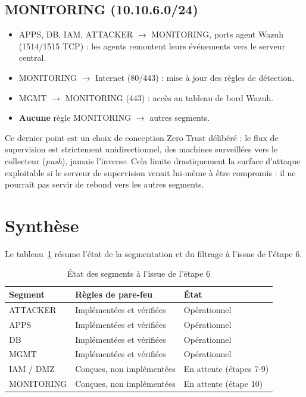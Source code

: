 \subsection{MONITORING (10.10.6.0/24)}

\begin{itemize}
    \item APPS, DB, IAM, ATTACKER $\rightarrow$ MONITORING, ports agent
    Wazuh (1514/1515 TCP) : les agents remontent leurs événements vers le
    serveur central.
    \item MONITORING $\rightarrow$ Internet (80/443) : mise à jour des
    règles de détection.
    \item MGMT $\rightarrow$ MONITORING (443) : accès au tableau de bord
    Wazuh.
    \item \textbf{Aucune} règle MONITORING $\rightarrow$ autres segments.
\end{itemize}

Ce dernier point est un choix de conception Zero Trust délibéré : le flux
de supervision est strictement unidirectionnel, des machines surveillées
vers le collecteur (\emph{push}), jamais l'inverse. Cela limite
drastiquement la surface d'attaque exploitable si le serveur de
supervision venait lui-même à être compromis : il ne pourrait pas servir
de rebond vers les autres segments.

\section{Synthèse}

Le tableau~\ref{tab:synthese-step6} résume l'état de la segmentation et
du filtrage à l'issue de l'étape 6.

\begin{table}[h]
\centering
\caption{État des segments à l'issue de l'étape 6}
\label{tab:synthese-step6}
\begin{tabular}{|l|l|l|}
\hline
\textbf{Segment} & \textbf{Règles de pare-feu} & \textbf{État} \\
\hline
ATTACKER & Implémentées et vérifiées & Opérationnel \\
APPS & Implémentées et vérifiées & Opérationnel \\
DB & Implémentées et vérifiées & Opérationnel \\
MGMT & Implémentées et vérifiées & Opérationnel \\
IAM / DMZ & Conçues, non implémentées & En attente (étapes 7-9) \\
MONITORING & Conçues, non implémentées & En attente (étape 10) \\
\hline
\end{tabular}
\end{table}

